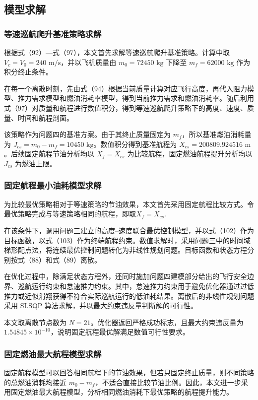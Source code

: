 \documentclass[withoutpreface,bwprint]{cumcmthesis} %
\begin{document}
\subsection{模型求解}
\subsubsection{等速巡航爬升基准策略求解}

根据式（92）—式（97），本文首先求解等速巡航爬升基准策略。计算中取 $V_c=V_0=240\text{ m/s}$，并以飞机质量由 $m_0=72450\text{ kg}$ 下降至 $m_f=62000\text{ kg}$ 作为积分终止条件。

在每一个离散时刻，先由式（94）根据当前质量计算对应飞行高度，再代入阻力模型、推力需求模型和燃油消耗率模型，得到当前推力需求和燃油消耗率。随后利用式（97）对质量和航程进行数值积分，得到等速巡航爬升策略下的高度、速度、质量、时间和航程剖面。

该策略作为问题四的基准方案。由于其终止质量固定为 $m_f$，所以基准燃油消耗量为 $J_{cs}=m_0-m_f=10450\text{ kg}$。数值积分得到基准航程为 $X_{cs}=200809.924516\text{ m}$。后续固定航程节油分析均以 $X_f=X_{cs}$ 为比较航程，固定燃油航程提升分析均以 $J_{cs}$ 为燃油上限。

\subsubsection{固定航程最小油耗模型求解}
为比较最优策略相对于等速策略的节油效果，本文首先采用固定航程比较方式。令最优策略完成与等速策略相同的航程，即取$X_f=X_{cs}.$

在该条件下，调用问题三建立的高度–速度联合最优控制模型，并以式（102）作为目标函数，以式（103）作为终端航程约束。数值求解时，采用问题三中的时间域梯形配点法，将连续最优控制问题转化为非线性规划问题。目标函数和状态方程分别按式（88）和式（89）离散。

在优化过程中，除满足状态方程外，还同时施加问题四建模部分给出的飞行安全边界、巡航运行约束和怠速推力约束。其中，怠速推力约束用于避免优化器通过过低推力或近似滑翔获得不符合实际巡航运行的低油耗结果。离散后的非线性规划问题采用 SLSQP 算法求解，并以最大约束违反量判断解的可行性。

本文取离散节点数为 $N=21$。优化器返回严格成功标志，且最大约束违反量为 $1.54845\times10^{-10}$，说明固定航程最优解满足数值可行性要求。
\subsubsection{固定燃油最大航程模型求解}
固定航程模型可以回答相同航程下的节油效果，但若只固定终止质量，则不同策略的总燃油消耗均接近 $m_0-m_f$，不适合直接比较节油比例。因此，本文进一步采用固定燃油最大航程模型，分析相同燃油消耗下最优策略的航程提升能力。
\end{document}
